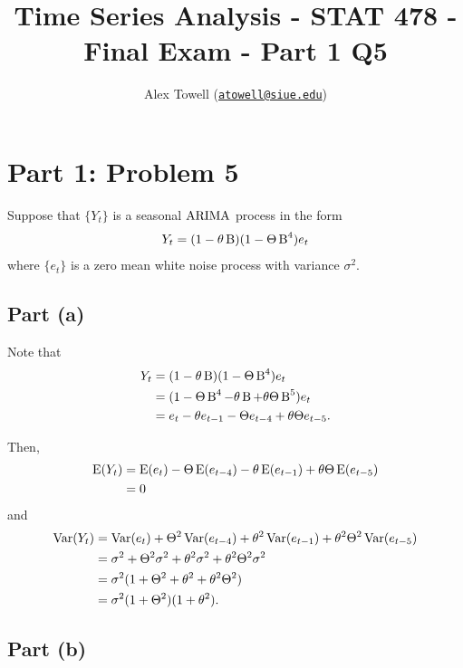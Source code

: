 \documentclass[
]{article}
\title{Time Series Analysis - STAT 478 - Final Exam - Part 1 Q5}
\author{Alex Towell
(\href{mailto:atowell@siue.edu}{\nolinkurl{atowell@siue.edu}})}
\date{}
\begin{document}
\maketitle

\hypertarget{part-1-problem-5}{%
\section{Part 1: Problem 5}\label{part-1-problem-5}}

Suppose that \(\{Y_t\}\) is a seasonal \(\operatorname{ARIMA}\) process in the form \[
  Y_t = (1-\theta \operatorname{B})(1- \Theta \operatorname{B}^4) e_t
\] where \(\{e_t\}\) is a zero mean white noise process with variance
\(σ^2\).

\hypertarget{part-a}{%
\subsection{Part (a)}\label{part-a}}


Note that \begin{align*}
  Y_t &= (1-\theta \operatorname{B})(1- \Theta \operatorname{B}^4) e_t\\
      &= (1-\Theta \operatorname{B}^4 - \theta \operatorname{B} + \theta \Theta \operatorname{B}^5) e_t\\
      &= e_t - \theta e_{t-1} -\Theta e_{t-4} + \theta\Theta e_{t-5}.
\end{align*}

Then, \begin{align*}
  \operatorname{E}(Y_t)
    &= \operatorname{E}(e_t)-\Theta \operatorname{E}(e_{t-4}) - \theta \operatorname{E}(e_{t-1}) + \theta\Theta \operatorname{E}(e_{t-5})\\
    &= 0
\end{align*} and \begin{align*}
  \operatorname{Var}(Y_t)
    &= \operatorname{Var}(e_t)+\Theta^2 \operatorname{Var}(e_{t-4}) + \theta^2 \operatorname{Var}(e_{t-1}) + \theta^2\Theta^2 \operatorname{Var}(e_{t-5})\\
    &= \sigma^2+\Theta^2 \sigma^2 + \theta^2 \sigma^2 + \theta^2\Theta^2 \sigma^2\\
    &= \sigma^2(1+\Theta^2+\theta^2+\theta^2\Theta^2)\\
    &= \sigma^2(1+\Theta^2)(1+\theta^2).
\end{align*}

\hypertarget{part-b}{%
\subsection{Part (b)}\label{part-b}}
\end{document}
